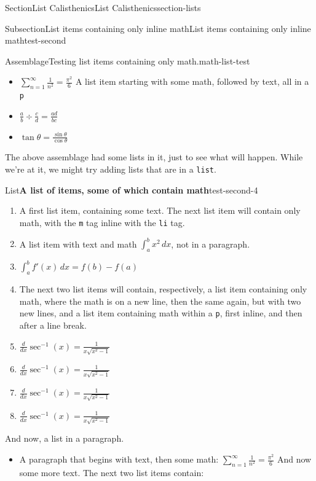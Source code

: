 \documentclass[twoside,10pt,]{article}
\newcommand{\mono}[1]{\texttt{#1}}
\numberwithin{equation}{section}
\begin{document}
\begin{sectionptx}{Section}{List Calisthenics}{}{List Calisthenics}{}{}{section-lists}
\begin{subsectionptx}{Subsection}{List items containing only inline math}{}{List items containing only inline math}{}{}{test-second}
\begin{assemblage}{Assemblage}{Testing list items containing only math.}{math-list-test}
\par
%
\begin{itemize}[label=\textbullet]
\item{}\(\sum_{n=1}^\infty\frac{1}{n^2}=\frac{\pi^2}{6}\) A list item starting with some math, followed by text, all in a \mono{p}%
\item{}\(\displaystyle \frac{a}{b}\div \frac{c}{d} = \frac{ad}{bc}\)%
\item{}\(\displaystyle \tan\theta = \frac{\sin\theta}{\cos\theta}\)%
\end{itemize}
%
\end{assemblage}
The above assemblage had some lists in it, just to see what will happen. While we're at it, we might try adding lists that are in a \mono{list}.%
\begin{listptx}{List}{\textbf{A list of items, some of which contain math}}{test-second-4}{}%
%
\begin{enumerate}
\item{}A first list item, containing some text. The next list item will contain only math, with the \mono{m} tag inline with the \mono{li} tag.%
\item{}A list item with text and math \(\int_a^b x^2\,dx\), not in a paragraph.%
\item{}\(\displaystyle \int_a^b f'(x)\, dx = f(b)-f(a)\)%
\item{}The next two list items will contain, respectively, a list item containing only math, where the math is on a new line, then the same again, but with two new lines, and a list item containing math within a \mono{p}, first inline, and then after a line break.%
\item{}\(\displaystyle \frac{d}{dx}\sec^{-1}(x) = \frac{1}{x\sqrt{x^2-1}}\)%
\item{}\(\displaystyle \frac{d}{dx}\sec^{-1}(x) = \frac{1}{x\sqrt{x^2-1}}\)%
\item{}\(\displaystyle \frac{d}{dx}\sec^{-1}(x) = \frac{1}{x\sqrt{x^2-1}}\)%
\item{}\(\displaystyle \frac{d}{dx}\sec^{-1}(x) = \frac{1}{x\sqrt{x^2-1}}\)%
\end{enumerate}
\end{listptx}%
And now, a list in a paragraph.%
\par
%
\begin{itemize}[label=\textbullet]
\item{}A paragraph that begins with text, then some math: \(\sum_{n=1}^\infty\frac{1}{n^2}=\frac{\pi^2}{6}\) And now some more text. The next two list items contain:%

\end{itemize}
\end{subsectionptx}
\end{sectionptx}
\end{document}
